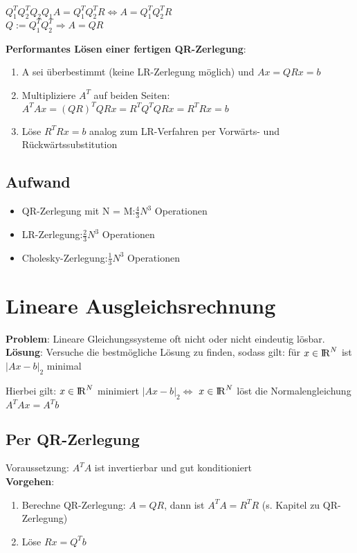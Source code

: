 \documentclass[10pt,a4paper]{article}
\def\realnumbers{{\rm I\!R}}
\begin{document}
\begin{center}
		$Q_1^TQ_2^TQ_2Q_1A = Q_1^TQ_2^TR \Leftrightarrow A = Q_1^TQ_2^TR$\\
		$Q := Q_1^TQ_2^T \Rightarrow A = QR$
	\end{center}
	\textbf{Performantes Lösen einer fertigen QR-Zerlegung}:
	\begin{enumerate}
		\item A sei überbestimmt (keine LR-Zerlegung möglich) und $Ax = QRx = b$
		\item Multipliziere $A^T$ auf beiden Seiten: $A^TAx = (QR)^TQRx = R^TQ^TQRx = R^TRx = b$
		\item Löse $R^TRx = b$ analog zum LR-Verfahren per Vorwärts- und Rückwärtssubstitution
	\end{enumerate}
	\subsection{Aufwand}
	\begin{itemize}
		\item QR-Zerlegung mit N = M:\hfill$\frac{4}{3}N^3$ Operationen
		\item LR-Zerlegung:\hfill$\frac{2}{3}N^3$ Operationen
		\item Cholesky-Zerlegung:\hfill$\frac{1}{3}N^3$ Operationen
	\end{itemize}
	\newpage
	\section{Lineare Ausgleichsrechnung}
	\textbf{Problem}: Lineare Gleichungssysteme oft nicht oder nicht eindeutig lösbar.\\
	\textbf{Lösung}: Versuche die bestmögliche Lösung zu finden, sodass gilt: für $x \in \realnumbers^N$ ist $|Ax - b|_2$ minimal
	\begin{center}
		Hierbei gilt: $x \in \realnumbers^N$ minimiert $|Ax - b|_2 \Leftrightarrow$ $x \in \realnumbers^N$ löst die Normalengleichung $A^TAx = A^Tb$
	\end{center}
	\subsection{Per QR-Zerlegung}
	Voraussetzung: $A^TA$ ist invertierbar und gut konditioniert\\
	\textbf{Vorgehen}:
	\begin{enumerate}
		\item Berechne QR-Zerlegung: $A = QR$, dann ist $A^TA = R^TR$ (s. Kapitel zu QR-Zerlegung)
		\item Löse $Rx = Q^Tb$
	\end{enumerate}
	
\end{document}
